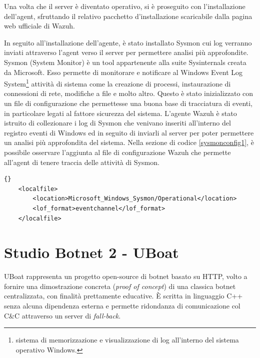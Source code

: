 Una volta che il server è diventato operativo, si è proseguito con l'installazione dell'agent, sfruttando il relativo pacchetto d'installazione scaricabile dalla pagina web ufficiale di Wazuh.
\medskip

In seguito all'installazione dell'agente, è stato installato Sysmon cui log verranno inviati attraverso l'agent verso il server per permettere analisi più approfondite. Sysmon \cite{sysmon} (System Monitor) è un tool appartenente alla suite Sysinternals creata da Microsoft. Esso permette di monitorare e notificare al Windows Event Log System\footnote{sistema di memorizzazione e visualizzazione di log all'interno del sistema operativo Windows.} attività di sistema come la creazione di processi, instaurazione di connessioni di rete, modifiche a file e molto altro. Questo è stato inizializzato con un file di configurazione \cite{sysmonconfig} che permettesse una buona base di tracciatura di eventi, in particolare legati al fattore sicurezza del sistema.
L'agente  Wazuh è stato istruito di collezionare i log di Sysmon che venivano inseriti all'interno del registro eventi di Windows ed in seguito di inviarli al server per poter permettere un analisi più approfondita del sistema.
Nella sezione di codice \ref{sysmonconfig1}, è possibile osservare l'aggiunta al file di configurazione Wazuh che permette all'agent di tenere traccia delle attività di Sysmon.
\begin{lstlisting}[floatplacement=H,caption={Aggiunta al file di configurazione dell'agent.},captionpos=b,label={sysmonconfig1}]{}
    <localfile>
        <location>Microsoft_Windows_Sysmon/Operational</location>
        <lof_format>eventchannel</lof_format>
    </localfile>
\end{lstlisting}



\chapter{Studio Botnet 2 - UBoat}




UBoat \cite{uboat} rappresenta un progetto open-source di botnet basato su HTTP, volto a fornire una dimostrazione concreta (\textit{proof of concept}) di una classica botnet centralizzata, con finalità prettamente educative. È scritta in linguaggio C++ senza alcuna dipendenza esterna e permette ridondanza di comunicazione col C\&C attraverso un server di \textit{fall-back}.

